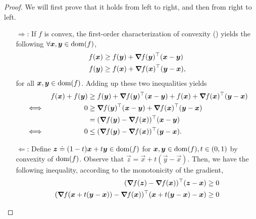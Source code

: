 \begin{proof}
    We will first prove that it holds from left to right, and then from right to left.

    \begin{enumerate}
        \item[$\Rightarrow$:] If $f$ is convex, the first-order characterization of convexity () yields the following $\forall \bm{x}, \bm{y} \in \mathrm{dom}(f)$,
              \begin{align*}
                  f(\bm{x}) & \geq f(\bm{y}) + \bm{\nabla}_{\! } f(\bm{y})^\top (\bm{x}-\bm{y})  \\
                  f(\bm{y}) & \geq f(\bm{x}) + \bm{\nabla}_{\! } f(\bm{x})^\top (\bm{y}-\bm{x}),
              \end{align*}
              for all $\bm{x},\bm{y}\in\mathrm{dom}(f)$. Adding up these two inequalities yields
              \begin{align*}
                       &  & f(\vec{x}) + f(\vec{y}) & \geq f(\vec{y}) + \transpose{\grad{f(\vec{y})}{}} (\vec{x}-\vec{y}) + f(\vec{x}) + \transpose{\grad{f(\vec{x})}{}} (\vec{y}-\vec{x}) \\
                  \iff &  & 0                       & \geq \transpose{\grad{f(\vec{y})}{}} (\vec{x}-\vec{y}) + \transpose{\grad{f(\vec{x})}{}} (\vec{y}-\vec{x})                           \\
                       &  &                         & = \transpose{(\grad{f(\vec{y})}{} - \grad{f(\vec{x})}{})} (\vec{x} - \vec{y})                                                        \\
                  \iff &  & 0                       & \leq \transpose{(\grad{f(\vec{y})}{} - \grad{f(\vec{x})}{})} (\vec{y} - \vec{x}).
              \end{align*}
        \item[$\Leftarrow$:] Define $\bm{z} \doteq (1-t) \bm{x} + t\bm{y} \in \mathrm{dom}(f)$ for
              $\bm{x},\bm{y}\in\mathrm{dom}(f), t \in (0,1)$ by convexity of $\mathrm{dom}(f)$. Observe that
              $\vec{z} = \vec{x} + t(\vec{y}-\vec{x})$. Then, we have the following inequality, according
              to the monotonicity of the gradient,
              \begin{align*}
                  \transpose{(\grad{f(\vec{z})}{} - \grad{f(\vec{x})}{})} (\vec{z} - \vec{x})                                           & \geq 0                            \\
                  \transpose{(\grad{f(\vec{x} + t(\vec{y}-\vec{x}))}{} - \grad{f(\vec{x})}{})} (\vec{x} + t(\vec{y}-\vec{x}) - \vec{x}) & \geq 0                            \\

\end{align*}
\end{enumerate}
\end{proof}
